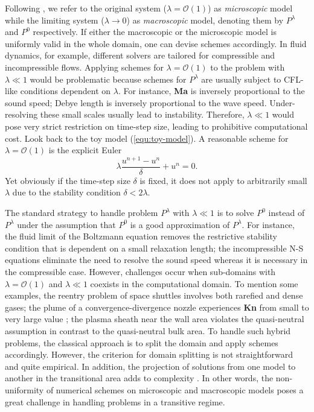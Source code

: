 \documentclass{report}
\begin{document}
 Following \cite{jin_2010}, we refer to the original system ($\lambda = \mathcal{O}(1)$) as \emph{microscopic} model while the limiting system ($\lambda \rightarrow 0$) as \emph{macroscopic} model, denoting them by $P^\lambda$ and $P^0$ respectively. If either the macroscopic or the microscopic model is uniformly valid in the whole domain, one can devise schemes accordingly. In fluid dynamics, for example, different solvers are tailored for compressible and incompressible flows. Applying schemes for $\lambda = \mathcal{O}(1)$ to the problem with $\lambda \ll 1$ would be problematic because schemes for $P^\lambda$ are usually subject to CFL-like conditions dependent on $\lambda$. For instance, \textbf{Ma} is inversely proportional to the sound speed; Debye length is inversely proportional to the wave speed. Under-resolving these small scales usually lead to instability. Therefore, $\lambda \ll 1$ would pose very strict restriction on time-step size, leading to prohibitive computational cost. Look back to the toy model (\ref{equ:toy-model}). A reasonable scheme for $\lambda = \mathcal{O}(1)$ is the explicit Euler
 \begin{equation*}
     \lambda\frac{u^{n+1}-u^{n}}{\delta} + u^n = 0.
 \end{equation*}
Yet obviously if the time-step size $\delta$ is fixed, it does not apply to arbitrarily small $\lambda$ due to the stability condition $\delta < 2\lambda$.  
 
 The standard strategy to handle problem $P^\lambda$ with $\lambda \ll 1$ is to solve $P^0$ instead of $P^\lambda$ under the assumption that $P^0$ is a good approximation of $P^\lambda$. For instance, the fluid limit of the Boltzmann equation removes the restrictive stability condition that is dependent on a small relaxation length; the incompressible N-S equations eliminate the need to resolve the sound speed whereas it is necessary in the compressible case. However, challenges occur when sub-domains with $\lambda = \mathcal{O}(1)$ and $\lambda \ll 1$ coexists in the computational domain. To mention some examples, the reentry problem of space shuttles involves both rarefied and dense gases; the plume of a convergence-divergence nozzle experiences \textbf{Kn} from small to very large value \citep{jenny2015}; the plasma sheath near the wall area violates the quasi-neutral assumption in contrast to the quasi-neutral bulk area. To handle such hybrid problems, the classical approach is to split the domain and apply schemes accordingly. However, the criterion for domain splitting is not straightforward and quite empirical. In addition, the projection of solutions from one model to another in the transitional area adds to complexity \citep{jin_2010, degond_2011}. In other words, the non-uniformity of numerical schemes on microscopic and macroscopic models poses a great challenge in handling problems in a transitive regime.
 
\end{document}
